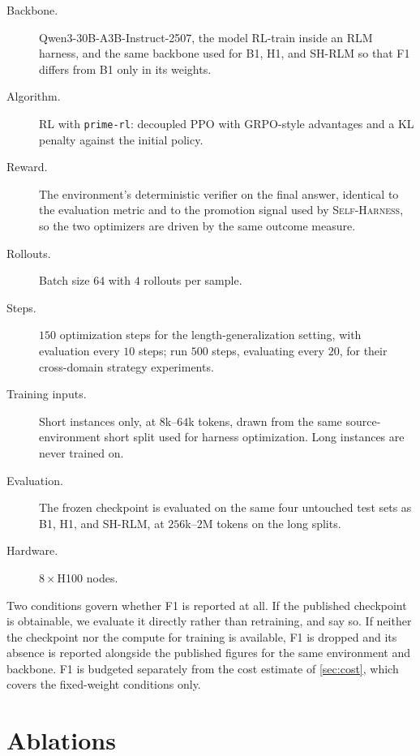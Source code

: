 \documentclass{article}
\newcommand{\rlm}{\textsc{RLM}\xspace}
\newcommand{\sh}{\textsc{Self-Harness}\xspace}
\begin{document}
\begin{description}
  \item[Backbone.] Qwen3-30B-A3B-Instruct-2507, the model \citet{zhang2026harness}
    RL-train inside an \rlm{} harness, and the same backbone used for B1, H1, and SH-RLM so that F1
    differs from B1 only in its weights.
  \item[Algorithm.] RL with \texttt{prime-rl}: decoupled PPO with GRPO-style advantages
    and a KL penalty against the initial policy.
  \item[Reward.] The environment's deterministic verifier on the final answer, identical
    to the evaluation metric and to the promotion signal used by \sh{}, so the two
    optimizers are driven by the same outcome measure.
  \item[Rollouts.] Batch size $64$ with $4$ rollouts per sample.
  \item[Steps.] $150$ optimization steps for the length-generalization setting, with
    evaluation every $10$ steps; \citet{zhang2026harness} run $500$ steps, evaluating
    every $20$, for their cross-domain strategy experiments.
  \item[Training inputs.] Short instances only, at $8$k--$64$k tokens, drawn from the
    same source-environment short split used for harness optimization. Long instances are
    never trained on.
  \item[Evaluation.] The frozen checkpoint is evaluated on the same four untouched test
    sets as B1, H1, and SH-RLM, at $256$k--$2$M tokens on the long splits.
  \item[Hardware.] $8\times$H100 nodes.
\end{description}

Two conditions govern whether F1 is reported at all. If the published checkpoint is
obtainable, we evaluate it directly rather than retraining, and say so. If neither the
checkpoint nor the compute for training is available, F1 is dropped and its absence is
reported alongside the published figures for the same environment and backbone. F1 is
budgeted separately from the cost estimate of \cref{sec:cost}, which covers the
fixed-weight conditions only.

\section{Ablations}
\label{app:ablations}
\end{document}
